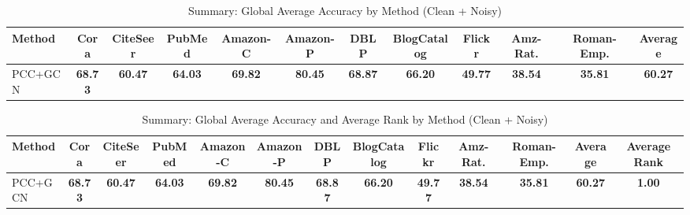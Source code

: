 \begin{table}[htbp]
\centering
\small
\caption{Summary: Global Average Accuracy by Method (Clean + Noisy)}
\label{tab:summary_mean}
\begin{tabular}{lccccccccccc}
\toprule
\textbf{Method} & \textbf{Cora} & \textbf{CiteSeer} & \textbf{PubMed} & \textbf{Amazon-C} & \textbf{Amazon-P} & \textbf{DBLP} & \textbf{BlogCatalog} & \textbf{Flickr} & \textbf{Amz-Rat.} & \textbf{Roman-Emp.} & \textbf{Average} \\
\midrule
PCC+GCN & \cellcolor[HTML]{A8D08D}\textbf{68.73} & \cellcolor[HTML]{A8D08D}\textbf{60.47} & \cellcolor[HTML]{A8D08D}\textbf{64.03} & \cellcolor[HTML]{A8D08D}\textbf{69.82} & \cellcolor[HTML]{A8D08D}\textbf{80.45} & \cellcolor[HTML]{A8D08D}\textbf{68.87} & \cellcolor[HTML]{A8D08D}\textbf{66.20} & \cellcolor[HTML]{A8D08D}\textbf{49.77} & \cellcolor[HTML]{A8D08D}\textbf{38.54} & \cellcolor[HTML]{A8D08D}\textbf{35.81} & \cellcolor[HTML]{A8D08D}\textbf{60.27} \\
\bottomrule
\end{tabular}
\end{table}


\begin{table}[htbp]
\centering
\small
\caption{Summary: Global Average Accuracy and Average Rank by Method (Clean + Noisy)}
\label{tab:summary_mean_and_rank}
\begin{tabular}{lcccccccccccc}
\toprule
\textbf{Method} & \textbf{Cora} & \textbf{CiteSeer} & \textbf{PubMed} & \textbf{Amazon-C} & \textbf{Amazon-P} & \textbf{DBLP} & \textbf{BlogCatalog} & \textbf{Flickr} & \textbf{Amz-Rat.} & \textbf{Roman-Emp.} & \textbf{Average} & \textbf{Average Rank} \\
\midrule
PCC+GCN & \cellcolor[HTML]{A8D08D}\textbf{68.73} & \cellcolor[HTML]{A8D08D}\textbf{60.47} & \cellcolor[HTML]{A8D08D}\textbf{64.03} & \cellcolor[HTML]{A8D08D}\textbf{69.82} & \cellcolor[HTML]{A8D08D}\textbf{80.45} & \cellcolor[HTML]{A8D08D}\textbf{68.87} & \cellcolor[HTML]{A8D08D}\textbf{66.20} & \cellcolor[HTML]{A8D08D}\textbf{49.77} & \cellcolor[HTML]{A8D08D}\textbf{38.54} & \cellcolor[HTML]{A8D08D}\textbf{35.81} & \cellcolor[HTML]{A8D08D}\textbf{60.27} & \cellcolor[HTML]{A8D08D}\textbf{1.00} \\
\bottomrule
\end{tabular}
\end{table}


